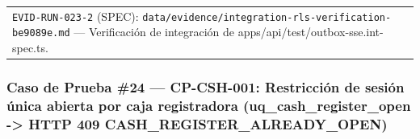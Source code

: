 \documentclass[10pt,a4paper]{article}
\begin{document}
{\begin{longtable}[]{@{}
  >{\raggedright\arraybackslash}p{}
  >{\raggedright\arraybackslash}p{}@{}}
\begin{minipage}[t]{\linewidth}
\texttt{EVID-{}\allowbreak{}RUN-{}\allowbreak{}023-{}\allowbreak{}2} (SPEC): \texttt{data/\allowbreak{}evidence/\allowbreak{}integration-{}\allowbreak{}rls-{}\allowbreak{}verification-{}\allowbreak{}be9089e.\allowbreak{}md} --- Verificación de integración de apps/api/test/outbox-sse.int-spec.ts.\strut
\end{minipage} \\
\end{longtable}
}

\endgroup\medskip


\subsubsection{Caso de Prueba \#24 --- CP-CSH-001: Restricción de sesión única abierta por caja registradora (uq\_cash\_register\_open -\textgreater{} HTTP 409 CASH\_REGISTER\_ALREADY\_OPEN)}\label{caso-de-prueba-24--cp-csh-001-restricciuxf3n-de-sesiuxf3n-uxfanica-abierta-por-caja-registradora-uq_cash_register_open---http-409-cash_register_already_open}

\begingroup\singlespacing\footnotesize\setlength{\parskip}{0pt}
\end{document}
